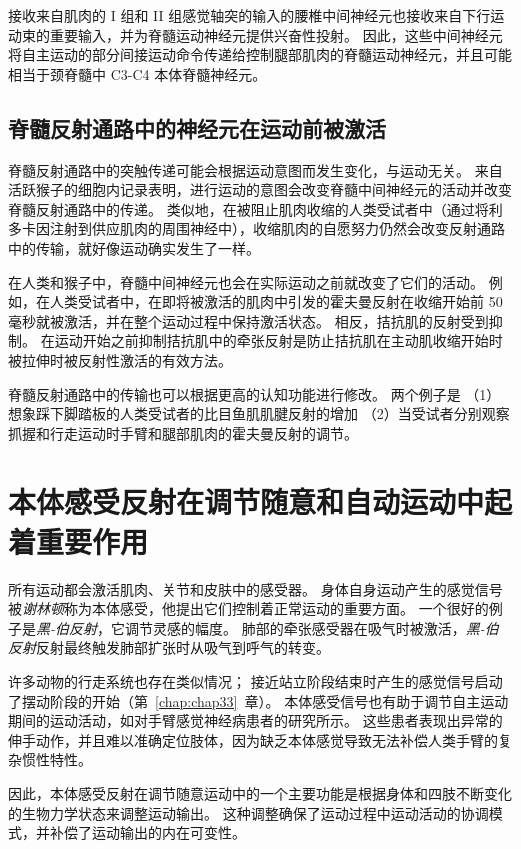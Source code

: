接收来自肌肉的 I 组和 II 组感觉轴突的输入的腰椎中间神经元也接收来自下行运动束的重要输入，并为脊髓运动神经元提供兴奋性投射。
因此，这些中间神经元将自主运动的部分间接运动命令传递给控制腿部肌肉的脊髓运动神经元，并且可能相当于颈脊髓中 C3-C4 本体脊髓神经元。



\subsection{脊髓反射通路中的神经元在运动前被激活}

脊髓反射通路中的突触传递可能会根据运动意图而发生变化，与运动无关。
来自活跃猴子的细胞内记录表明，进行运动的意图会改变脊髓中间神经元的活动并改变脊髓反射通路中的传递。
类似地，在被阻止肌肉收缩的人类受试者中（通过将利多卡因注射到供应肌肉的周围神经中），收缩肌肉的自愿努力仍然会改变反射通路中的传输，就好像运动确实发生了一样。


在人类和猴子中，脊髓中间神经元也会在实际运动之前就改变了它们的活动。
例如，在人类受试者中，在即将被激活的肌肉中引发的霍夫曼反射在收缩开始前 50 毫秒就被激活，并在整个运动过程中保持激活状态。
相反，拮抗肌的反射受到抑制。
在运动开始之前抑制拮抗肌中的牵张反射是防止拮抗肌在主动肌收缩开始时被拉伸时被反射性激活的有效方法。


脊髓反射通路中的传输也可以根据更高的认知功能进行修改。
两个例子是
（1） 想象踩下脚踏板的人类受试者的比目鱼肌肌腱反射的增加 
（2）当受试者分别观察抓握和行走运动时手臂和腿部肌肉的霍夫曼反射的调节。



\section{本体感受反射在调节随意和自动运动中起着重要作用}

所有运动都会激活肌肉、关节和皮肤中的感受器。
身体自身运动产生的感觉信号被\textit{谢林顿}称为本体感受，他提出它们控制着正常运动的重要方面。
一个很好的例子是\textit{黑-伯反射}，它调节灵感的幅度。
肺部的牵张感受器在吸气时被激活，\textit{黑-伯反射}反射最终触发肺部扩张时从吸气到呼气的转变。


许多动物的行走系统也存在类似情况；
接近站立阶段结束时产生的感觉信号启动了摆动阶段的开始（第~\ref{chap:chap33}~章）。
本体感受信号也有助于调节自主运动期间的运动活动，如对手臂感觉神经病患者的研究所示。
这些患者表现出异常的伸手动作，并且难以准确定位肢体，因为缺乏本体感觉导致无法补偿人类手臂的复杂惯性特性。


因此，本体感受反射在调节随意运动中的一个主要功能是根据身体和四肢不断变化的生物力学状态来调整运动输出。
这种调整确保了运动过程中运动活动的协调模式，并补偿了运动输出的内在可变性。




